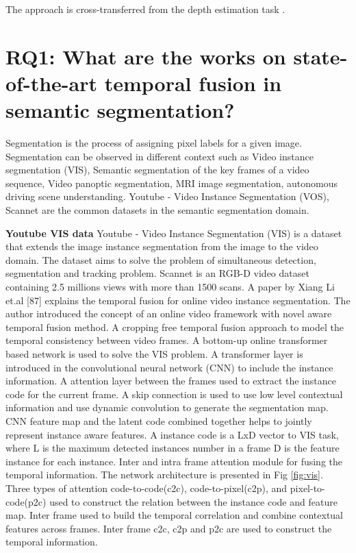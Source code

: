     The approach is cross-transferred from the depth estimation task \cite{52_hou2019multi} \cite{03_duzceker2021deepvideomvs}. 
    
    \section{RQ1: What are the works on state-of-the-art temporal fusion in semantic segmentation?}
	
	Segmentation is the process of assigning pixel labels for a given image. Segmentation can be observed in different context such as Video instance segmentation (VIS), Semantic segmentation of the key frames of a video sequence, Video panoptic segmentation, MRI image segmentation, autonomous driving scene understanding. Youtube - Video Instance Segmentation (VOS), Scannet are the common datasets in the semantic segmentation domain. 
	
	{ \bf Youtube VIS data}
	Youtube - Video Instance Segmentation (VIS) is a dataset that extends the image instance segmentation from the image to the video domain. The dataset aims to solve the problem of simultaneous detection, segmentation and tracking problem. Scannet is an RGB-D video dataset containing 2.5 millions views with more than 1500 scans. 
	A paper by Xiang Li et.al [87] explains the temporal fusion for online video instance segmentation. The author introduced the concept of an online video framework with novel aware temporal fusion method. A cropping free temporal fusion approach to model the temporal consistency between video frames. A bottom-up online transformer based network is used to solve the VIS problem. A transformer layer is introduced in the convolutional neural network (CNN) to include the instance information. A attention layer between the frames used to extract the instance code for the current frame. A skip connection is used to use low level contextual information and use dynamic convolution to generate the segmentation map. CNN feature map and the latent code combined together helps to jointly represent instance aware features. A instance code is a LxD vector to VIS task, where L is the maximum detected instances number in a frame D is the feature instance for each instance. Inter and intra frame attention module for fusing the temporal information. The network architecture is presented in Fig \ref{fig:vis}. Three types of attention code-to-code(c2c), code-to-pixel(c2p), and pixel-to-code(p2c) used to construct the	relation between the instance code and feature map. Inter frame used to build the temporal correlation and combine contextual features across frames. Inter frame c2c, c2p and p2c are used to construct the temporal information.
	
